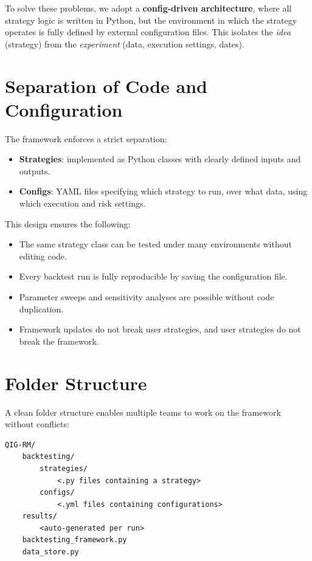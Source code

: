 \documentclass[11pt]{article}
\begin{document}
To solve these problems, we adopt a \textbf{config-driven architecture}, where all
strategy logic is written in Python, but the environment in which the strategy operates
is fully defined by external configuration files. This isolates the \textit{idea}
(strategy) from the \textit{experiment} (data, execution settings, dates).

\section{Separation of Code and Configuration}

The framework enforces a strict separation:

\begin{itemize}
    \item \textbf{Strategies}: implemented as Python classes with clearly defined inputs and outputs.
    \item \textbf{Configs}: YAML files specifying which strategy to run, over what data, using which execution and risk settings.
\end{itemize}

This design ensures the following:

\begin{itemize}
    \item The same strategy class can be tested under many environments without editing code.
    \item Every backtest run is fully reproducible by saving the configuration file.
    \item Parameter sweeps and sensitivity analyses are possible without code duplication.
    \item Framework updates do not break user strategies, and user strategies do not break the framework.
\end{itemize}

\newpage
\section{Folder Structure}

A clean folder structure enables multiple teams to work on the framework without conflicts:

\begin{verbatim}
QIG-RM/
    backtesting/
        strategies/
            <.py files containing a strategy>
        configs/
            <.yml files containing configurations>
    results/
        <auto-generated per run>
    backtesting_framework.py
    data_store.py
\end{verbatim}
\end{document}
